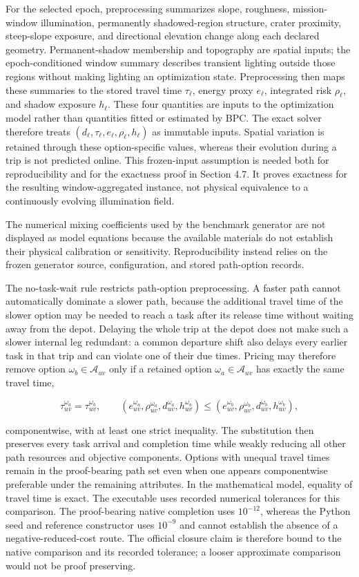 \documentclass[
  11pt,
]{article}
\begin{document}
For the selected epoch, preprocessing summarizes slope, roughness,
mission-window illumination, permanently shadowed-region structure,
crater proximity, steep-slope exposure, and directional elevation change
along each declared geometry. Permanent-shadow membership and topography
are spatial inputs; the epoch-conditioned window summary describes
transient lighting outside those regions without making lighting an
optimization state. Preprocessing then maps these summaries to the
stored travel time \(\tau_\ell\), energy proxy \(e_\ell\), integrated
risk \(\rho_\ell\), and shadow exposure \(h_\ell\). These four
quantities are inputs to the optimization model rather than quantities
fitted or estimated by BPC. The exact solver therefore treats
\((d_\ell,\tau_\ell,e_\ell,\rho_\ell,h_\ell)\) as immutable inputs.
Spatial variation is retained through these option-specific values,
whereas their evolution during a trip is not predicted online. This
frozen-input assumption is needed both for reproducibility and for the
exactness proof in Section 4.7. It proves exactness for the resulting
window-aggregated instance, not physical equivalence to a continuously
evolving illumination field.

The numerical mixing coefficients used by the benchmark generator are
not displayed as model equations because the available materials do not
establish their physical calibration or sensitivity. Reproducibility
instead relies on the frozen generator source, configuration, and stored
path-option records.

The no-task-wait rule restricts path-option preprocessing. A faster path
cannot automatically dominate a slower path, because the additional
travel time of the slower option may be needed to reach a task after its
release time without waiting away from the depot. Delaying the whole
trip at the depot does not make such a slower internal leg redundant: a
common departure shift also delays every earlier task in that trip and
can violate one of their due times. Pricing may therefore remove option
\(\omega_b\in\mathcal{A}_{uv}\) only if a retained option
\(\omega_a\in\mathcal{A}_{uv}\) has exactly the same travel time,

\[
\tau_{uv}^{\omega_a}=\tau_{uv}^{\omega_b},
\qquad
(e_{uv}^{\omega_a},\rho_{uv}^{\omega_a},d_{uv}^{\omega_a},
h_{uv}^{\omega_a})
\le
(e_{uv}^{\omega_b},\rho_{uv}^{\omega_b},d_{uv}^{\omega_b},
h_{uv}^{\omega_b}),
\]

componentwise, with at least one strict inequality. The substitution
then preserves every task arrival and completion time while weakly
reducing all other path resources and objective components. Options with
unequal travel times remain in the proof-bearing path set even when one
appears componentwise preferable under the remaining attributes. In the
mathematical model, equality of travel time is exact. The executable
uses recorded numerical tolerances for this comparison. The
proof-bearing native completion uses \(10^{-12}\), whereas the Python
seed and reference constructor uses \(10^{-9}\) and cannot establish the
absence of a negative-reduced-cost route. The official closure claim is
therefore bound to the native comparison and its recorded tolerance; a
looser approximate comparison would not be proof preserving.
\end{document}

